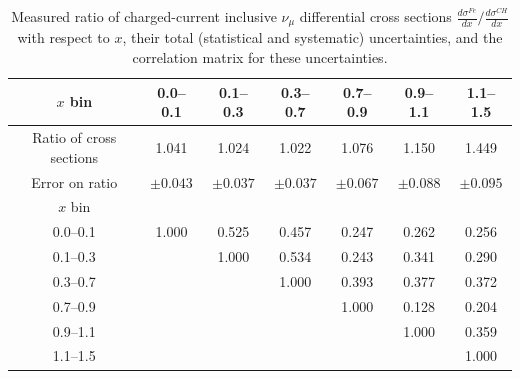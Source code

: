 \documentclass[aps,preprint,showpacs,superscriptaddress]{revtex4} %
\newcommand{\numu}{\ensuremath{\nu_{\mu}}\xspace}
\newcommand{\Xbj}{\ensuremath{x}\xspace}
\begin{document}
\begingroup
\squeezetable
\begin{table}
  \begin{tabular}{c|cccccc}
    \hline \hline
    \Xbj bin & 0.0--0.1 & 0.1--0.3 & 0.3--0.7 & 0.7--0.9 & 0.9--1.1 & 1.1--1.5 \\ 
    \hline
    Ratio of cross sections & 1.041 & 1.024 & 1.022 & 1.076 & 1.150 & 1.449 \\ 
    Error on ratio & $ \pm 0.043 $ & $ \pm 0.037 $ & $ \pm 0.037 $ & $ \pm 0.067 $ & $ \pm 0.088 $ & $ \pm 0.095 $ \\ 
    \hline
    \Xbj bin &  &  &  &  &  &  \\ 
    0.0--0.1 & 1.000 & 0.525 & 0.457 & 0.247 & 0.262 & 0.256 \\ 
    0.1--0.3 &  & 1.000 & 0.534 & 0.243 & 0.341 & 0.290 \\ 
    0.3--0.7 &  &  & 1.000 & 0.393 & 0.377 & 0.372 \\ 
    0.7--0.9 &  &  &  & 1.000 & 0.128 & 0.204 \\ 
    0.9--1.1 &  &  &  &  & 1.000 & 0.359 \\ 
    1.1--1.5 &  &  &  &  &  & 1.000 \\ 
    \hline \hline
  \end{tabular}
  \caption{Measured ratio of charged-current inclusive \numu differential cross sections $\frac{d\sigma^{Fe}}{d\Xbj}/\frac{d\sigma^{CH}}{d\Xbj}$ with respect to \Xbj, their total (statistical and systematic) uncertainties, and the correlation matrix for these uncertainties.}
  \label{tab:x_ratio_26_92_results_table}
\end{table}
\endgroup
\end{document}
